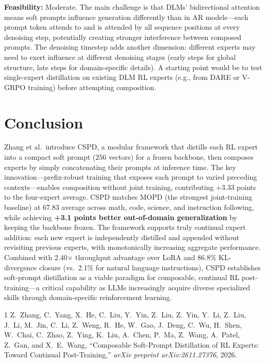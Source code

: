 \documentclass[11pt,a4paper]{article}
\begin{document}
\textbf{Feasibility:} Moderate. The main challenge is that DLMs' bidirectional attention means soft prompts influence generation differently than in AR models---each prompt token attends to and is attended by all sequence positions at every denoising step, potentially creating stronger interference between composed prompts. The denoising timestep adds another dimension: different experts may need to exert influence at different denoising stages (early steps for global structure, late steps for domain-specific details). A starting point would be to test single-expert distillation on existing DLM RL experts (e.g., from DARE or V-GRPO training) before attempting composition.

\section{Conclusion}
Zhang et al.\ introduce CSPD, a modular framework that distills each RL expert into a compact soft prompt ($256$ vectors) for a frozen backbone, then composes experts by simply concatenating their prompts at inference time. The key innovation---prefix-robust training that exposes each prompt to varied preceding contexts---enables composition without joint training, contributing +3.33 points to the four-expert average. CSPD matches MOPD (the strongest joint-training baseline) at 67.83 average across math, code, science, and instruction following, while achieving \textbf{+3.1 points better out-of-domain generalization} by keeping the backbone frozen. The framework supports truly continual expert addition: each new expert is independently distilled and appended without revisiting previous experts, with monotonically increasing aggregate performance. Combined with 2.40$\times$ throughput advantage over LoRA and 86.8\% KL-divergence closure (vs.\ 2.1\% for natural language instructions), CSPD establishes soft-prompt distillation as a viable paradigm for composable, continual RL post-training---a critical capability as LLMs increasingly acquire diverse specialized skills through domain-specific reinforcement learning.

\begin{thebibliography}{1}
Z.~Zhang, C.~Yang, X.~He, C.~Liu, Y.~Yin, Z.~Liu, Z.~Yin, Y.~Li, Z.~Liu, J.~Li, M.~Jin, C.~Li, Z.~Weng, R.~He, W.~Gao, J.~Deng, C.~Wu, H.~Shen, W.~Chai, C.~Zhao, Z.~Ying, K.~Liu, A.~Chen, P.~Ma, Z.~Wang, A.~Patel, Z.~Gan, and X.~E.~Wang,
``Composable Soft-Prompt Distillation of RL Experts: Toward Continual Post-Training,''
\textit{arXiv preprint arXiv:2611.27376}, 2026.
\end{thebibliography}
\end{document}
